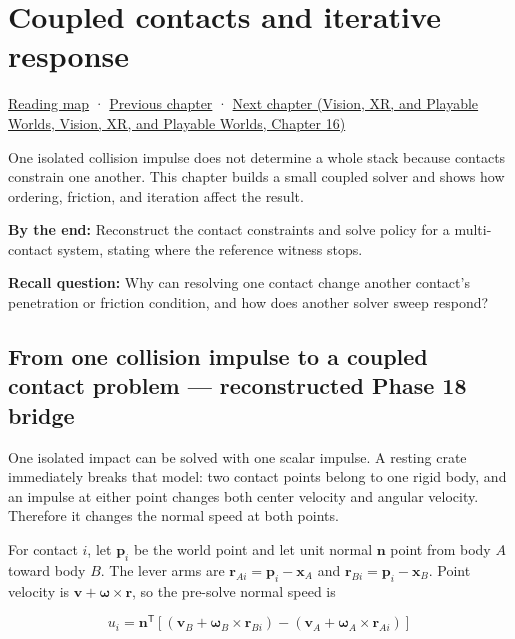 \hypertarget{06-engine-ii-ch040}{}
\chapter{Coupled contacts and iterative response}\label{stagechapter:06-engine-ii-ch040}\label{06-engine-ii-ch040-coupled-contacts-and-iterative-response}

\hyperref[volume-reading-map]{Reading map} · \hyperref[06-engine-ii-ch039-composable-timesteps-and-stable-simulation-policy]{Previous chapter} · \href{../07-Vision-XR-and-Playable-Worlds/main.pdf\#nameddest=06-engine-ii-ch041-evidence-tools-and-revisable-design}{Next chapter (Vision, XR, and Playable Worlds, Vision, XR, and Playable Worlds, Chapter 16)}

One isolated collision impulse does not determine a whole stack because contacts constrain one another. This chapter builds a small coupled solver and shows how ordering, friction, and iteration affect the result.

\textbf{By the end:} Reconstruct the contact constraints and solve policy for a multi-contact system, stating where the reference witness stops.

\textbf{Recall question:} Why can resolving one contact change another contact's penetration or friction condition, and how does another solver sweep respond?

\section{From one collision impulse to a coupled contact problem --- reconstructed Phase 18 bridge}\label{06-engine-ii-ch040-from-one-collision-impulse-to-a-coupled-contact-problem-reconstructed-phase-18-bridge}

One isolated impact can be solved with one scalar impulse. A resting crate immediately breaks that model: two contact points belong to one rigid body, and an impulse at either point changes both center velocity and angular velocity. Therefore it changes the normal speed at both points.

For contact \(i\), let \(\mathbf p_i\) be the world point and let unit normal \(\mathbf n\) point from body \(A\) toward body \(B\). The lever arms are \(\mathbf r_{Ai}=\mathbf p_i-\mathbf x_A\) and \(\mathbf r_{Bi}=\mathbf p_i-\mathbf x_B\). Point velocity is \(\mathbf v+\boldsymbol\omega\times\mathbf r\), so the pre-solve normal speed is

\[
u_i=\mathbf n^\mathsf T\left[(\mathbf v_B+\boldsymbol\omega_B\times\mathbf r_{Bi})-(\mathbf v_A+\boldsymbol\omega_A\times\mathbf r_{Ai})\right]
\]

